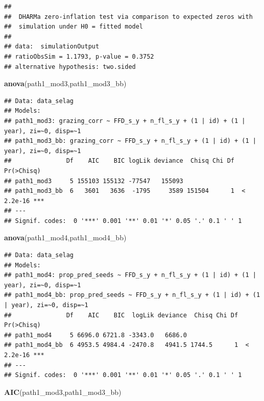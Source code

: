 \documentclass[
]{article}
\newenvironment{Shaded}{\begin{snugshade}}{\end{snugshade}}
\newcommand{\KeywordTok}[1]{\textcolor[rgb]{0.13,0.29,0.53}{\textbf{#1}}}
\newcommand{\NormalTok}[1]{#1}
\begin{document}
\begin{verbatim}
## 
##  DHARMa zero-inflation test via comparison to expected zeros with
##  simulation under H0 = fitted model
## 
## data:  simulationOutput
## ratioObsSim = 1.1793, p-value = 0.3752
## alternative hypothesis: two.sided
\end{verbatim}

\begin{Shaded}
\begin{Highlighting}[]
\KeywordTok{anova}\NormalTok{(path1\_mod3,path1\_mod3\_bb)}
\end{Highlighting}
\end{Shaded}

\begin{verbatim}
## Data: data_selag
## Models:
## path1_mod3: grazing_corr ~ FFD_s_y + n_fl_s_y + (1 | id) + (1 | year), zi=~0, disp=~1
## path1_mod3_bb: grazing_corr ~ FFD_s_y + n_fl_s_y + (1 | id) + (1 | year), zi=~0, disp=~1
##               Df    AIC    BIC logLik deviance  Chisq Chi Df Pr(>Chisq)    
## path1_mod3     5 155103 155132 -77547   155093                             
## path1_mod3_bb  6   3601   3636  -1795     3589 151504      1  < 2.2e-16 ***
## ---
## Signif. codes:  0 '***' 0.001 '**' 0.01 '*' 0.05 '.' 0.1 ' ' 1
\end{verbatim}

\begin{Shaded}
\begin{Highlighting}[]
\KeywordTok{anova}\NormalTok{(path1\_mod4,path1\_mod4\_bb)}
\end{Highlighting}
\end{Shaded}

\begin{verbatim}
## Data: data_selag
## Models:
## path1_mod4: prop_pred_seeds ~ FFD_s_y + n_fl_s_y + (1 | id) + (1 | year), zi=~0, disp=~1
## path1_mod4_bb: prop_pred_seeds ~ FFD_s_y + n_fl_s_y + (1 | id) + (1 | year), zi=~0, disp=~1
##               Df    AIC    BIC  logLik deviance  Chisq Chi Df Pr(>Chisq)    
## path1_mod4     5 6696.0 6721.8 -3343.0   6686.0                             
## path1_mod4_bb  6 4953.5 4984.4 -2470.8   4941.5 1744.5      1  < 2.2e-16 ***
## ---
## Signif. codes:  0 '***' 0.001 '**' 0.01 '*' 0.05 '.' 0.1 ' ' 1
\end{verbatim}

\begin{Shaded}
\begin{Highlighting}[]
\KeywordTok{AIC}\NormalTok{(path1\_mod3,path1\_mod3\_bb)}
\end{Highlighting}
\end{Shaded}
\end{document}
